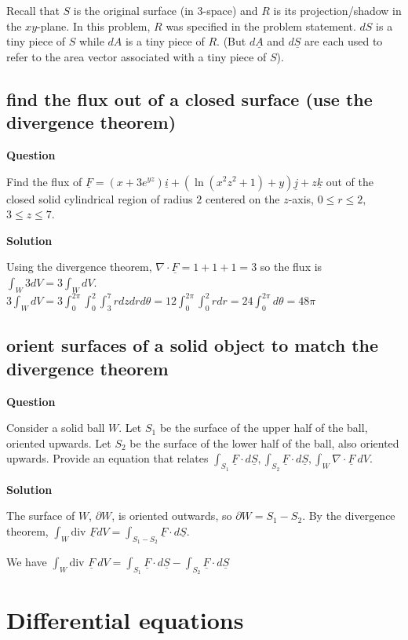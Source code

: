 \documentclass[12pt,letterpaper,noanswers]{exam}
\newcommand{\mb}[1]{\underline{#1}}
\begin{document}
Recall that $S$ is the original surface (in $3$-space) and $R$ is its projection/shadow in the $xy$-plane.  In this problem, $R$ was specified in the problem statement. $dS$ is a tiny piece of $S$ while $dA$ is a tiny piece of $R$.  (But $d\mb A$ and $d\mb S$ are each used to refer to the area vector associated with a tiny piece of $S$).



\subsection{find the flux out of a closed surface (use the divergence theorem)}
\noindent\textbf{Question}


 Find the flux of $\underline F = (x+3e^{yz})\mb i + (\ln(x^2z^2+1)+y)\mb j + z\mb k$ out of the closed solid cylindrical region of radius $2$ centered on the $z$-axis, $0\leq r\leq 2$, $3\leq z \leq 7$.



\noindent\textbf{Solution}


Using the divergence theorem, $\nabla\cdot \underline F = 1 + 1 + 1 = 3$ so the flux is $\int_W 3dV = 3\int_W dV$.  
$3\int_W dV = 3\int_0^{2\pi}\int_0^2\int_3^7 rdzdrd\theta = 12\int_0^{2\pi}\int_0^2 rdr = 24\int_0^{2\pi}d\theta = 48\pi$

\subsection{orient surfaces of a solid object to match the divergence theorem}
\noindent\textbf{Question}

Consider a solid ball $W$.  Let $S_1$ be the surface of the upper half of the ball, oriented upwards.  Let $S_2$ be the surface of the lower half of the ball, also oriented upwards.  Provide an equation that relates $\displaystyle\int_{S_1}\mb F\cdot d\mb S,\int_{S_2}\mb F\cdot d\mb S,\int_{W}\nabla \cdot \mb F\ dV$.


\noindent\textbf{Solution}

The surface of $W$, $\partial W$, is oriented outwards, so $\partial W = S_1-S_2$.
By the divergence theorem, $\int_W \text{div }\mb F dV = \int_{S_1-S_2}\mb F\cdot d\mb S$.

We have $\displaystyle\int_W \text{div }\mb F\ dV = \int_{S_1}\mb F\cdot d\mb S-\int_{S_2}\mb F\cdot d\mb S$

\section{Differential equations}
\end{document}
